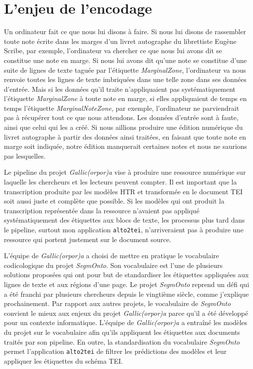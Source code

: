 \documentclass[class=article, crop=false]{standalone}
\begin{document}
	
\section{L'enjeu de l'encodage}
Un ordinateur fait ce que nous lui disons à faire. Si nous lui disons de rassembler toute note écrite dans les marges d'un livret autographe du librettiste Eugène Scribe, par exemple, l'ordinateur va chercher ce que nous lui avons dit se constitue une note en marge. Si nous lui avons dit qu'une note se constitue d'une suite de lignes de texte taguée par l'étiquette \textit{MarginalZone}, l'ordinateur va nous renvoie toutes les lignes de texte imbriquées dans une telle zone dans ses données d'entrée. Mais si les données qu'il traite n'appliquaient pas systématiquement l'étiquette \textit{MarginalZone} à toute note en marge, si elles appliquaient de temps en temps l'étiquette \textit{MarginalNoteZone}, par exemple, l'ordinateur ne parviendrait pas à récupérer tout ce que nous attendons. Les données d'entrée sont à faute, ainsi que celui qui les a créé. Si nous aillions produire une édition numérique du livret autographe à partir des données ainsi traitées, en faisant que toute note en marge soit indiquée, notre édition manquerait certaines notes et nous ne saurions pas lesquelles.

Le pipeline du projet \textit{Gallic(orpor)a} vise à produire une ressource numérique sur laquelle les chercheurs et les lecteurs peuvent compter. Il est important que la transcription produite par les modèles \acrshort{HTR} et transformée en le document \acrshort{TEI} soit aussi juste et complète que possible. Si les modèles qui ont produit la transcription représentée dans la ressource n'avaient pas appliqué systématiquement des étiquettes aux blocs de texte, les processus plus tard dans le pipeline, surtout mon application \texttt{alto2tei}, n'arriveraient pas à produire une ressource qui portent justement sur le document source.

L'équipe de \textit{Gallic(orpor)a} a choisi de mettre en pratique le vocabulaire codicologique du projet \textit{SegmOnto}. Son vocabulaire est l'une de plusieurs solutions proposées qui ont pour but de standardiser les étiquettes appliquées aux lignes de texte et aux régions d'une page. Le projet \textit{SegmOnto} reprend un défi qui a été franchi par plusieurs chercheurs depuis le vingtième siècle, comme j'explique prochainement. Par rapport aux autres projets, le vocabulaire de \textit{SegmOnto} convient le mieux aux enjeux du projet \textit{Gallic(orpor)a} parce qu'il a été développé pour un contexte informatique. L'équipe de \textit{Gallic(orpor)a} a entraîné les modèles du projet sur le vocabulaire afin qu'ils appliquent les étiquettes aux documents traités par son pipeline. En outre, la standardisation du vocabulaire \textit{SegmOnto} permet l'application \texttt{alto2tei} de filtrer les prédictions des modèles et leur appliquer les étiquettes du schéma \acrshort{TEI}.
\end{document}
